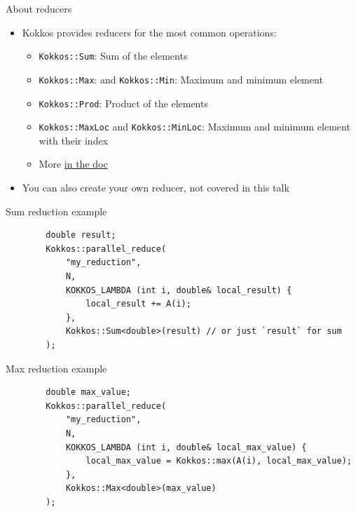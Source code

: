 \documentclass[aspectratio=169]{beamer}
\begin{document}
\begin{frame}{About reducers}
    \begin{itemize}
        \item Kokkos provides reducers for the most common operations:
        \begin{itemize}
            \item \texttt{Kokkos::Sum}: Sum of the elements
            \item \texttt{Kokkos::Max}: and \texttt{Kokkos::Min}: Maximum and minimum element
            \item \texttt{Kokkos::Prod}: Product of the elements
            \item \texttt{Kokkos::MaxLoc} and \texttt{Kokkos::MinLoc}: Maximum and minimum element with their index
            \item More \href{https://kokkos.org/kokkos-core-wiki/ProgrammingGuide/Custom-Reductions-Built-In-Reducers.html}{in the doc}
        \end{itemize}
        \item You can also create your own reducer, not covered in this talk
    \end{itemize}
\end{frame}


\begin{frame}[fragile]{Sum reduction example}
    \begin{verbatim}
        double result;
        Kokkos::parallel_reduce(
            "my_reduction",
            N,
            KOKKOS_LAMBDA (int i, double& local_result) {
                local_result += A(i);
            },
            Kokkos::Sum<double>(result) // or just `result` for sum
        );
    \end{verbatim}
\end{frame}


\begin{frame}[fragile]{Max reduction example}
    \begin{verbatim}
        double max_value;
        Kokkos::parallel_reduce(
            "my_reduction",
            N,
            KOKKOS_LAMBDA (int i, double& local_max_value) {
                local_max_value = Kokkos::max(A(i), local_max_value);
            },
            Kokkos::Max<double>(max_value)
        );
    \end{verbatim}
\end{frame}
\end{document}
